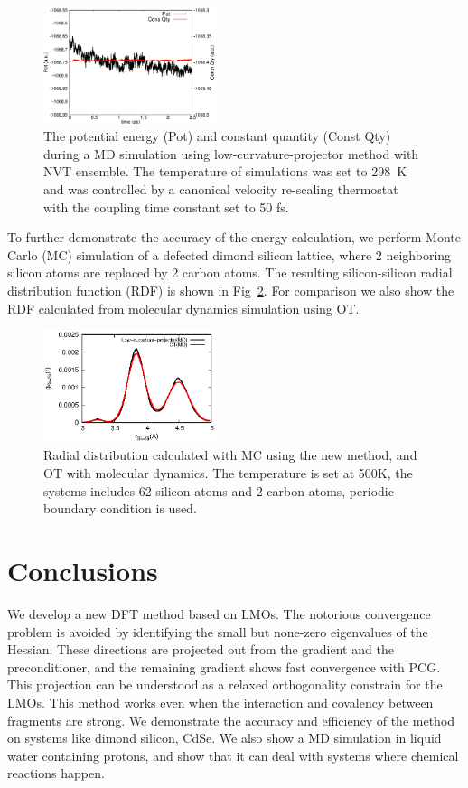 \documentclass[aps,prl,twocolumn,reprint,amsmath,amssymb]{revtex4-1}
\begin{document}
\begin{figure}
\includegraphics[width=0.45\textwidth]{const.eps}
\caption{The potential energy (Pot) and constant quantity (Const Qty) during a MD simulation using low-curvature-projector method with NVT ensemble. The temperature of simulations was set to 298~K and was controlled by a canonical velocity re-scaling thermostat\cite{bussi2007canonical} with the coupling time constant set to 50 fs.}
\label{fig:md}
\end{figure}

To further demonstrate the accuracy of the energy calculation, we perform Monte Carlo (MC) simulation of a defected dimond silicon lattice, where 2 neighboring silicon atoms are replaced by 2 carbon atoms. The resulting silicon-silicon radial distribution function (RDF) is shown in Fig~\ref{fig:mc}. For comparison we also show the RDF calculated from molecular dynamics simulation using OT. 

\begin{figure}
\centering
\includegraphics[width=0.45\textwidth]{rdf_si}
\caption{Radial distribution calculated with MC using the new method, and OT with molecular dynamics. The temperature is set at 500K, the systems includes 62 silicon atoms and 2 carbon atoms, periodic boundary condition is used.}
\label{fig:mc}
\end{figure}

\section{Conclusions} 

We develop a new DFT method based on LMOs. The notorious convergence problem is avoided by identifying the small but none-zero eigenvalues of the Hessian. These directions are projected out from the gradient and the preconditioner, and the remaining gradient shows fast convergence with PCG. This projection can be understood as a relaxed orthogonality constrain for the LMOs. This method works even when the interaction and covalency between fragments are strong. We demonstrate the accuracy and efficiency of the method on systems like dimond silicon, CdSe. We also show a MD simulation in liquid water containing protons, and show that it can deal with systems where chemical reactions happen.
\end{document}
